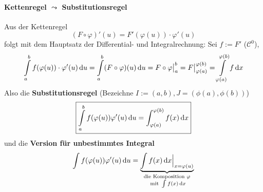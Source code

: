 \paragraph{Kettenregel $\leadsto$ Substitutionsregel} Aus der Kettenregel
$$(F \circ \varphi)' (u) = F'(\varphi (u)) \cdot \varphi'(u)$$
folgt mit dem Hauptsatz der Differential- und Integralrechnung: Sei $f := F'$ ($\mathcal{C}^0$),
$$ \int\limits_a^b f(\varphi(u)) \cdot \varphi'(u) \, \mathrm{d} u = \int\limits_a^b (F \circ \varphi) (u) \, \mathrm{d} u= F \circ \varphi \big\vert_a^b = F\big\vert^{\varphi(b)}_{\varphi(a)} = \int\limits_{\varphi(a)}^{\varphi(b)} f \, \mathrm{d} x
$$
Also die \textbf{Substitutionsregel} (Bezeichne $I:= (a,b), J = (\phi(a),\phi(b))$)
$$
\boxed{
\int\limits_a^b f(\varphi(u)) \varphi'(u) \, \mathrm{d} u = \int_{\varphi(a)}^{\varphi(b)} f(x) \, \mathrm{d} x 
}
$$
und die \textbf{Version für unbestimmtes Integral}
$$ \int f(\varphi(u)) \varphi'(u) \, \mathrm{d} u = \underbrace{\int f(x) \, \mathrm{d} x \Big \vert_{x =\varphi(u)}}_{\substack{\text{die Komposition }\varphi \\ \text{ mit } \int f(x)\, \mathrm{d} x}} $$
